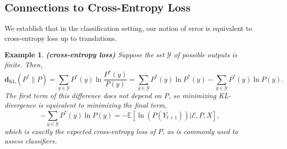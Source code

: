 \documentclass[twoside,11pt]{article}
\newtheorem{example}{Example}
\def\environment{\mathcal{E}}
\def\KL{\mathbf{d}_{\mathrm{KL}}}
\def\E{\mathbb{E}}
\begin{document}
\subsection{Connections to Cross-Entropy Loss}
We establish that in the classification setting, our notion of error is equivalent to cross-entropy loss up to translations.
\begin{example}
{\bf (cross-entropy loss)}
Suppose the set $\mathcal{Y}$ of possible outputs is finite.  Then,
$$\KL(P^* \| P) = \sum_{y \in \mathcal{Y}} P^*(y)  \ln\frac{P^*(y)}{P(y)} = \sum_{y \in \mathcal{Y}} P^*(y)  \ln P^*(y) - \sum_{y \in \mathcal{Y}} P^*(y)  \ln P(y).$$
The first term of this difference does not depend on $P$, so minimizing KL-divergence is equivalent to minimizing the final term,
$$- \sum_{y \in \mathcal{Y}} P^*(y) \ln P(y) = - \E[\ln(P(Y_{t+1})) | \environment, P, X],$$
which is exactly the expected cross-entropy loss of $P$, as is commonly used to assess classifiers.
\end{example}
\end{document}
